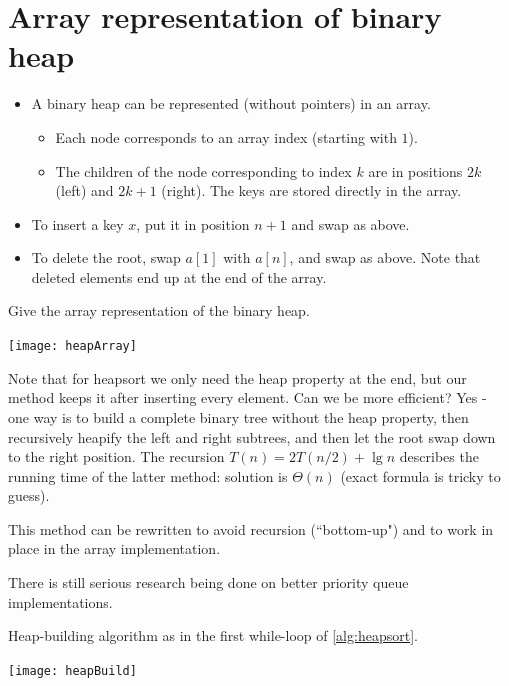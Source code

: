 \section{Array representation of binary heap}
\begin{itemize}
  \item A binary heap can be represented  (without pointers) in an array. 
  \begin{itemize}
	\item Each node corresponds to an array index (starting with $1$). 
	\item The children of the node corresponding to index $k$ are in positions $2k$ (left) 
	and $2k+1$ (right). The keys are stored directly in the array.
  \end{itemize}
  \item To insert a key $x$, put it in position $n+1$ and swap as above.
  \item To delete the root, swap $a[1]$ with $a[n]$, and swap as above. 
  Note that deleted elements end up at the end of the array.
\end{itemize}

\begin{Boxample}[0]
Give the array representation of the binary heap.
\begin{center}
\texttt{[image: heapArray]}
\end{center}
\end{Boxample}

Note that for heapsort we only need the heap property at the end, but our method keeps it after inserting every element. 
Can we be more efficient? Yes - one way is to build a complete binary tree without the heap property, then
recursively heapify the left and right subtrees, and then let the root swap 
down to the right position. The recursion $T(n) = 2T(n/2) + \lg n$ describes the running time of the 
latter method: solution is $\Theta(n)$ (exact formula is tricky to guess).
 
This method can be rewritten to avoid recursion (``bottom-up") and to work 
in place in the array implementation. 

There is still serious research being done on better priority queue implementations.

\begin{Boxample}\label{ex:heapbuild}
Heap-building algorithm as in the first while-loop of \cref{alg:heapsort}.
\begin{center}
\texttt{[image: heapBuild]}
\end{center}
\end{Boxample}

